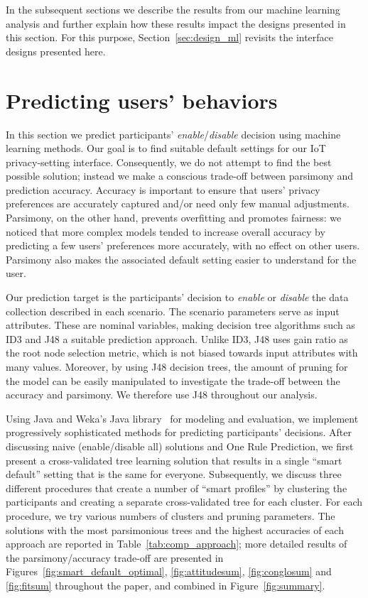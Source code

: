 In the subsequent sections we describe the results from our machine learning analysis and further explain how these results impact the designs presented in this section. For this purpose, Section~\ref{sec:design_ml} revisits the interface designs presented here.

\section{Predicting users' behaviors}\label{sec:predict}
In this section we predict participants' \textit{enable}/\textit{disable} decision using machine learning methods. Our goal is to find suitable default settings for our IoT privacy-setting interface. Consequently, we do not attempt to find the best possible solution; instead we make a conscious trade-off between parsimony and prediction accuracy. Accuracy is important to ensure that users' privacy preferences are accurately captured and/or need only few manual adjustments. Parsimony, on the other hand, prevents overfitting and promotes fairness: we noticed that more complex models tended to increase overall accuracy by predicting a few users' preferences more accurately, with no effect on other users. Parsimony also makes the associated default setting easier to understand for the user.

Our prediction target is the participants' decision to \textit{enable} or \textit{disable} the data collection described in each scenario. The scenario parameters serve as input attributes. These are nominal variables, making decision tree algorithms such as ID3 and J48 a suitable prediction approach. Unlike ID3, J48 uses gain ratio as the root node selection metric, which is not biased towards input attributes with many values. Moreover, by using J48 decision trees, the amount of pruning for the model can be easily manipulated to investigate the trade-off between the accuracy and parsimony. We therefore use J48 throughout our analysis.

Using Java and Weka's Java library~\cite{witten2016data} for modeling and evaluation, we implement progressively sophisticated methods for predicting participants' decisions. After discussing naive (enable/disable all) solutions and One Rule Prediction, we first present a cross-validated tree learning solution that results in a single ``smart default'' setting that is the same for everyone. Subsequently, we discuss three different procedures that create a number of ``smart profiles'' by clustering the participants and creating a separate cross-validated tree for each cluster. For each procedure, we try various numbers of clusters and pruning parameters. The solutions with the most parsimonious trees and the highest accuracies of each approach are reported in Table~\ref{tab:comp_approach}; more detailed results of the parsimony/accuracy trade-off are presented in Figures~\ref{fig:smart_default_optimal}, \ref{fig:attitudesum}, \ref{fig:conglosum} and \ref{fig:fitsum} throughout the paper, and combined in Figure~\ref{fig:summary}.

